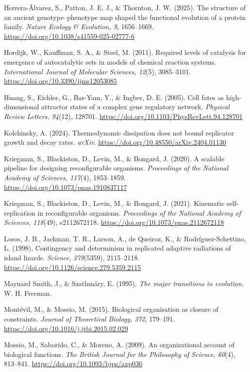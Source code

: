 \documentclass[
  11pt,
]{article}
\begin{document}
Herrera-Álvarez, S., Patton, J. E. J., \& Thornton, J. W. (2025). The
structure of an ancient genotype--phenotype map shaped the functional
evolution of a protein family. \emph{Nature Ecology \& Evolution, 9},
1656--1669. \url{https://doi.org/10.1038/s41559-025-02777-6}

Hordijk, W., Kauffman, S. A., \& Steel, M. (2011). Required levels of
catalysis for emergence of autocatalytic sets in models of chemical
reaction systems. \emph{International Journal of Molecular Sciences,
12}(5), 3085--3101. \url{https://doi.org/10.3390/ijms12053085}

Huang, S., Eichler, G., Bar-Yam, Y., \& Ingber, D. E. (2005). Cell fates
as high-dimensional attractor states of a complex gene regulatory
network. \emph{Physical Review Letters, 94}(12), 128701.
\url{https://doi.org/10.1103/PhysRevLett.94.128701}

Kolchinsky, A. (2024). Thermodynamic dissipation does not bound
replicator growth and decay rates. \emph{arXiv}.
\url{https://doi.org/10.48550/arXiv.2404.01130}

Kriegman, S., Blackiston, D., Levin, M., \& Bongard, J. (2020). A
scalable pipeline for designing reconfigurable organisms.
\emph{Proceedings of the National Academy of Sciences, 117}(4),
1853--1859. \url{https://doi.org/10.1073/pnas.1910837117}

Kriegman, S., Blackiston, D., Levin, M., \& Bongard, J. (2021).
Kinematic self-replication in reconfigurable organisms.
\emph{Proceedings of the National Academy of Sciences, 118}(49),
e2112672118. \url{https://doi.org/10.1073/pnas.2112672118}

Losos, J. B., Jackman, T. R., Larson, A., de Queiroz, K., \&
Rodríguez-Schettino, L. (1998). Contingency and determinism in
replicated adaptive radiations of island lizards. \emph{Science,
279}(5359), 2115--2118.
\url{https://doi.org/10.1126/science.279.5359.2115}

Maynard Smith, J., \& Szathmáry, E. (1995). \emph{The major transitions
in evolution}. W. H. Freeman.

Montévil, M., \& Mossio, M. (2015). Biological organisation as closure
of constraints. \emph{Journal of Theoretical Biology, 372}, 179--191.
\url{https://doi.org/10.1016/j.jtbi.2015.02.029}

Mossio, M., Saborido, C., \& Moreno, A. (2009). An organizational
account of biological functions. \emph{The British Journal for the
Philosophy of Science, 60}(4), 813--841.
\url{https://doi.org/10.1093/bjps/axp036}
\end{document}
